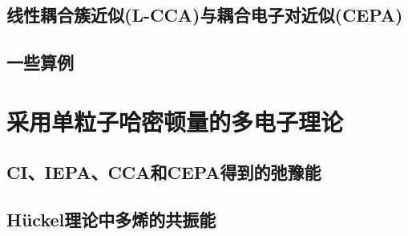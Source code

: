 \subsection{线性耦合簇近似(L-CCA)与耦合电子对近似(CEPA)}\label{sec5.2.3}
\subsection{一些算例}

\section{采用单粒子哈密顿量的多电子理论}
\subsection{CI、IEPA、CCA和CEPA得到的弛豫能}
\subsection{H\"uckel理论中多烯的共振能}

